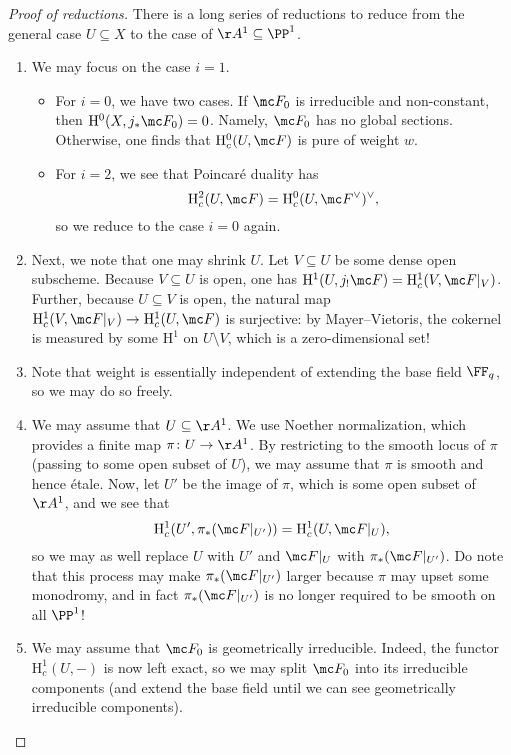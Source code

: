 \documentclass[../notes.tex]{subfiles}
\begin{document}
\begin{proof}[Proof of reductions]
	There is a long series of reductions to reduce from the general case $U\subseteq X$ to the case of $\AA^1\subseteq\PP^1$.
	\begin{enumerate}
		\item We may focus on the case $i=1$.
		\begin{itemize}
			\item For $i=0$, we have two cases. If $\mc F_0$ is irreducible and non-constant, then $\mathrm H^0(X,j_*\mc F_0)=0$. Namely, $\mc F_0$ has no global sections. Otherwise, one finds that $\mathrm H^0_c(U,\mc F)$ is pure of weight $w$.
			\item For $i=2$, we see that Poincar\'e duality has
			\[\mathrm H^2_c(U,\mc F)=\mathrm H^0_c(U,\mc F^\lor)^\lor,\]
			so we reduce to the case $i=0$ again.
		\end{itemize}
		
		\item Next, we note that one may shrink $U$. Let $V\subseteq U$ be some dense open subscheme. Because $V\subseteq U$ is open, one has $\mathrm H^1(U,j_!\mc F)=\mathrm H^1_c(V,\mc F|_V)$. Further, because $U\subseteq V$ is open, the natural map $\mathrm H^1_c(V,\mc F|_V)\to\mathrm H^1_c(U,\mc F)$ is surjective: by Mayer--Vietoris, the cokernel is measured by some $\mathrm H^1$ on $U\setminus V$, which is a zero-dimensional set!

		\item Note that weight is essentially independent of extending the base field $\FF_q$, so we may do so freely.

		\item We may assume that $U\subseteq\AA^1$. We use Noether normalization, which provides a finite map $\pi\colon U\to\AA^1$. By restricting to the smooth locus of $\pi$ (passing to some open subset of $U$), we may assume that $\pi$ is smooth and hence \'etale. Now, let $U'$ be the image of $\pi$, which is some open subset of $\AA^1$, and we see that
		\[\mathrm H^1_c(U',\pi_*(\mc F|_{U'}))=\mathrm H^1_c(U,\mc F|_U),\]
		so we may as well replace $U$ with $U'$ and $\mc F|_U$ with $\pi_*(\mc F|_{U'})$. Do note that this process may make $\pi_*(\mc F|_{U'})$ larger because $\pi$ may upset some monodromy, and in fact $\pi_*(\mc F|_{U'})$ is no longer required to be smooth on all $\PP^1$!

		\item We may assume that $\mc F_0$ is geometrically irreducible. Indeed, the functor $\mathrm H^1_c(U,-)$ is now left exact, so we may split $\mc F_0$ into its irreducible components (and extend the base field until we can see geometrically irreducible components).


\end{enumerate}
\end{proof}
\end{document}
